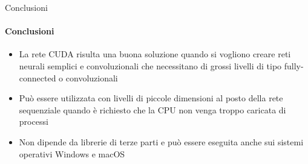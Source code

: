 \documentclass[
 ]{beamer}
\begin{document}
\begin{frame}{Conclusioni}
    \framesubtitle{Conclusioni}
    \smallskip
    \begin{itemize} [<+->]
        \setlength\itemsep{3em}
        \item \large La rete CUDA risulta una buona soluzione quando si vogliono creare reti neurali semplici e convoluzionali che necessitano di grossi livelli di tipo fully-connected o convoluzionali
        \item \large Può essere utilizzata con livelli di piccole dimensioni al posto della rete sequenziale quando è richiesto che la CPU non venga troppo caricata di processi
        \item \large Non dipende da librerie di terze parti e può essere eseguita anche sui sistemi operativi Windows e macOS
    \end{itemize}     
\end{frame}
\end{document}
